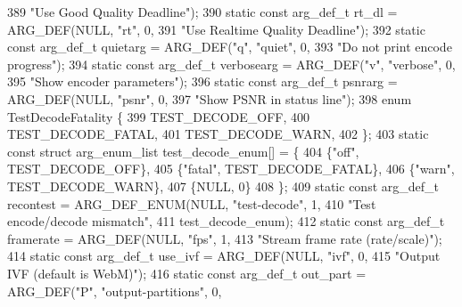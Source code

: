 \begin{DoxyCodeInclude}
{{389                                                   \textcolor{stringliteral}{"Use Good Quality Deadline"});
390 \textcolor{keyword}{static} \textcolor{keyword}{const} arg\_def\_t rt\_dl            = ARG\_DEF(NULL, \textcolor{stringliteral}{"rt"}, 0,
391                                                   \textcolor{stringliteral}{"Use Realtime Quality Deadline"});
392 \textcolor{keyword}{static} \textcolor{keyword}{const} arg\_def\_t quietarg         = ARG\_DEF(\textcolor{stringliteral}{"q"}, \textcolor{stringliteral}{"quiet"}, 0,
393                                                   \textcolor{stringliteral}{"Do not print encode progress"});
394 \textcolor{keyword}{static} \textcolor{keyword}{const} arg\_def\_t verbosearg       = ARG\_DEF(\textcolor{stringliteral}{"v"}, \textcolor{stringliteral}{"verbose"}, 0,
395                                                   \textcolor{stringliteral}{"Show encoder parameters"});
396 \textcolor{keyword}{static} \textcolor{keyword}{const} arg\_def\_t psnrarg          = ARG\_DEF(NULL, \textcolor{stringliteral}{"psnr"}, 0,
397                                                   \textcolor{stringliteral}{"Show PSNR in status line"});
398 \textcolor{keyword}{enum} TestDecodeFatality \{
399   TEST\_DECODE\_OFF,
400   TEST\_DECODE\_FATAL,
401   TEST\_DECODE\_WARN,
402 \};
403 \textcolor{keyword}{static} \textcolor{keyword}{const} \textcolor{keyword}{struct }arg\_enum\_list test\_decode\_enum[] = \{
404   \{\textcolor{stringliteral}{"off"},   TEST\_DECODE\_OFF\},
405   \{\textcolor{stringliteral}{"fatal"}, TEST\_DECODE\_FATAL\},
406   \{\textcolor{stringliteral}{"warn"},  TEST\_DECODE\_WARN\},
407   \{NULL, 0\}
408 \};
409 \textcolor{keyword}{static} \textcolor{keyword}{const} arg\_def\_t recontest = ARG\_DEF\_ENUM(NULL, \textcolor{stringliteral}{"test-decode"}, 1,
410                                                 \textcolor{stringliteral}{"Test encode/decode mismatch"},
411                                                 test\_decode\_enum);
412 \textcolor{keyword}{static} \textcolor{keyword}{const} arg\_def\_t framerate        = ARG\_DEF(NULL, \textcolor{stringliteral}{"fps"}, 1,
413                                                   \textcolor{stringliteral}{"Stream frame rate (rate/scale)"});
414 \textcolor{keyword}{static} \textcolor{keyword}{const} arg\_def\_t use\_ivf          = ARG\_DEF(NULL, \textcolor{stringliteral}{"ivf"}, 0,
415                                                   \textcolor{stringliteral}{"Output IVF (default is WebM)"});
416 \textcolor{keyword}{static} \textcolor{keyword}{const} arg\_def\_t out\_part = ARG\_DEF(\textcolor{stringliteral}{"P"}, \textcolor{stringliteral}{"output-partitions"}, 0,
}}
\end{DoxyCodeInclude}
